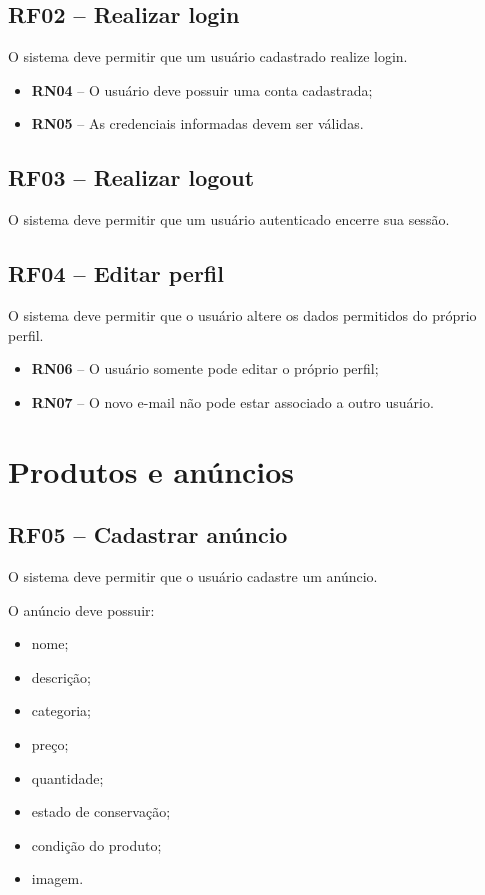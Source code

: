 \documentclass{scrreprt}
\newenvironment{fieldlist}
	{\renewcommand{\labelitemi}{--}\begin{itemize}}
	{\end{itemize}}
\begin{document}
\subsection{RF02 -- Realizar login}
O sistema deve permitir que um usuário cadastrado realize login.
\begin{itemize}
	\item \textbf{RN04} -- O usuário deve possuir uma conta cadastrada;
	\item \textbf{RN05} -- As credenciais informadas devem ser válidas.
\end{itemize}

\subsection{RF03 -- Realizar logout}
O sistema deve permitir que um usuário autenticado encerre sua sessão.

\subsection{RF04 -- Editar perfil}
O sistema deve permitir que o usuário altere os dados permitidos do próprio perfil.
\begin{itemize}
	\item \textbf{RN06} -- O usuário somente pode editar o próprio perfil;
	\item \textbf{RN07} -- O novo e-mail não pode estar associado a outro usuário.
\end{itemize}

\section{Produtos e anúncios}

\subsection{RF05 -- Cadastrar anúncio}
O sistema deve permitir que o usuário cadastre um anúncio.

O anúncio deve possuir:
\begin{fieldlist}
	\item nome;
	\item descrição;
	\item categoria;
	\item preço;
	\item quantidade;
	\item estado de conservação;
	\item condição do produto;
	\item imagem.
\end{fieldlist}
\end{document}
